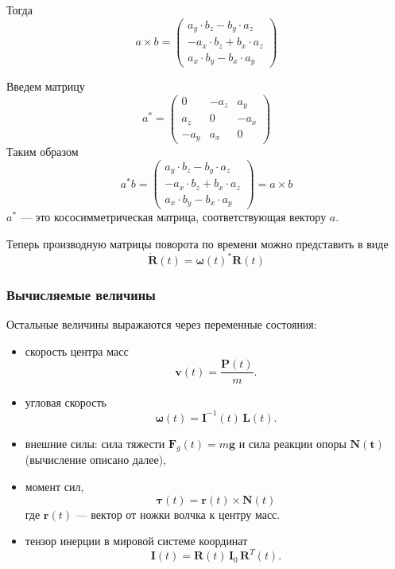 \documentclass{article}
\begin{document}
\begin{itemize}
Тогда
\[
a \times b = \begin{pmatrix}
a_{y} \cdot b_{z} - b_{y} \cdot a_{z}\\
- a_{x} \cdot b_{z} + b_{x} \cdot a_{z}\\
a_{x} \cdot b_{y} - b_{x} \cdot a_{y}
\end{pmatrix}
\]

Введем матрицу
\[
a^* = \begin{pmatrix}
0      & -a_{z} & a_{y}\\
a_{z}  &    0   & -a_{x}\\
-a_{y} & a_{x}  &   0
\end{pmatrix}
\]
Таким образом
\[
a^*b = \begin{pmatrix}
a_{y} \cdot b_{z} - b_{y} \cdot a_{z}\\
- a_{x} \cdot b_{z} + b_{x} \cdot a_{z}\\
a_{x} \cdot b_{y} - b_{x} \cdot a_{y}
\end{pmatrix} = 
a \times b
\]
$a^*$ --- это кососимметрическая матрица, соответствующая вектору $a$.

Теперь производную матрицы поворота по времени можно представить в виде
\[
\dot{\mathbf{R}}(t) = \boldsymbol{\omega}(t)^* {\mathbf{R}}(t)
\]
\end{itemize}


\subsubsection{Вычисляемые величины}
Остальные величины выражаются через переменные состояния:
\begin{itemize}
\item скорость центра масс
\[
\mathbf{v}(t) = \frac{\mathbf{P}(t)}{m}.
\]

\item угловая скорость
\[
\boldsymbol{\omega}(t) = \mathbf{I}^{-1}(t) \, \mathbf{L}(t).
\]

\item внешние силы: сила тяжести $\mathbf{F}_g(t) = m\mathbf{g}$ и сила реакции опоры $\mathbf{N(t)}$ (вычисление описано далее),

\item момент сил,
\[\boldsymbol{\tau}(t) = \mathbf{r}(t) \times \mathbf{N}(t)\]
где $\mathbf{r}(t)$ --- вектор от ножки волчка к центру масс.
\item тензор инерции в мировой системе координат
\[
\mathbf{I}(t) = \mathbf{R}(t) \, \mathbf{I}_0 \, \mathbf{R}^T(t).
\]
\end{itemize}
\end{document}
